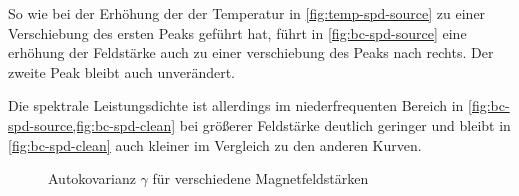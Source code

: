 \documentclass[main.tex]{subfiles}
\begin{document}
So wie bei der Erhöhung der der Temperatur in \cref{fig:temp-spd-source} zu einer Verschiebung des ersten Peaks geführt hat, führt in  \cref{fig:bc-spd-source} eine erhöhung der Feldstärke auch zu einer verschiebung des Peaks nach rechts. Der zweite Peak bleibt auch unverändert.

Die spektrale Leistungsdichte ist allerdings im niederfrequenten Bereich in \cref{fig:bc-spd-source,fig:bc-spd-clean} bei größerer Feldstärke deutlich geringer und bleibt in \cref{fig:bc-spd-clean} auch kleiner im Vergleich zu den anderen Kurven.

\begin{figure}[H]
    \centering
    \caption{Autokovarianz $\gamma$ für verschiedene Magnetfeldstärken }\label{fig:bc-autocov}
\end{figure}
\end{document}
